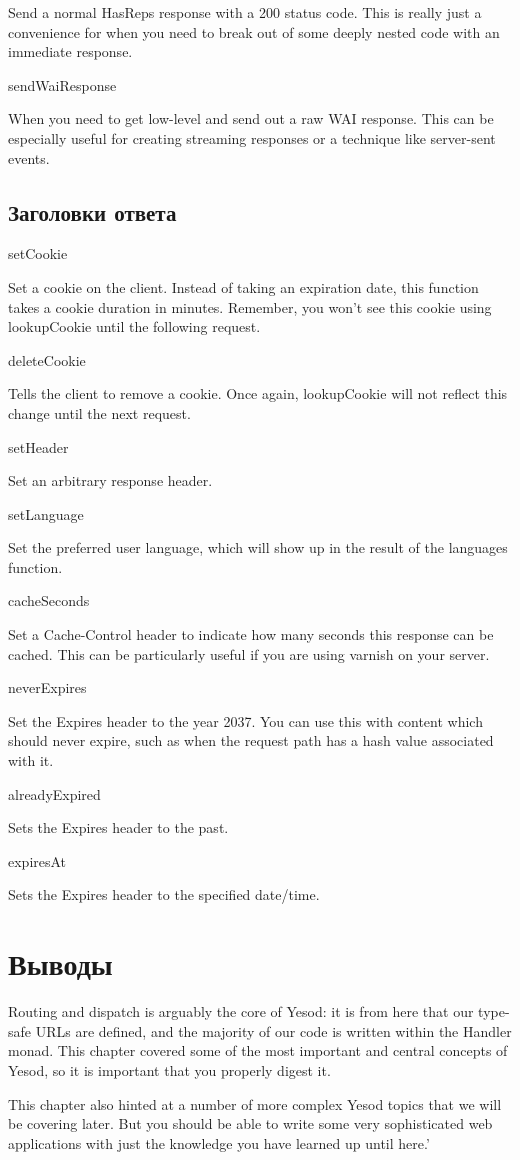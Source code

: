 Send a normal HasReps response with a 200 status code. This is really
just a convenience for when you need to break out of some deeply
nested code with an immediate response.

sendWaiResponse

When you need to get low-level and send out a raw WAI response. This
can be especially useful for creating streaming responses or a
technique like server-sent events.

\subsection{Заголовки ответа}

setCookie

Set a cookie on the client. Instead of taking an expiration date, this
function takes a cookie duration in minutes. Remember, you won't see
this cookie using lookupCookie until the following request.

deleteCookie

Tells the client to remove a cookie. Once again, lookupCookie will not
reflect this change until the next request.

setHeader

Set an arbitrary response header.

setLanguage

Set the preferred user language, which will show up in the result of
the languages function.

cacheSeconds

Set a Cache-Control header to indicate how many seconds this response
can be cached. This can be particularly useful if you are using
varnish on your server.

neverExpires

Set the Expires header to the year 2037. You can use this with content
which should never expire, such as when the request path has a hash
value associated with it.

alreadyExpired

Sets the Expires header to the past.

expiresAt

Sets the Expires header to the specified date/time.

\section{Выводы}

Routing and dispatch is arguably the core of Yesod: it is from here
that our type-safe URLs are defined, and the majority of our code is
written within the Handler monad. This chapter covered some of the
most important and central concepts of Yesod, so it is important that
you properly digest it.

This chapter also hinted at a number of more complex Yesod topics that
we will be covering later. But you should be able to write some very
sophisticated web applications with just the knowledge you have
learned up until here.'
